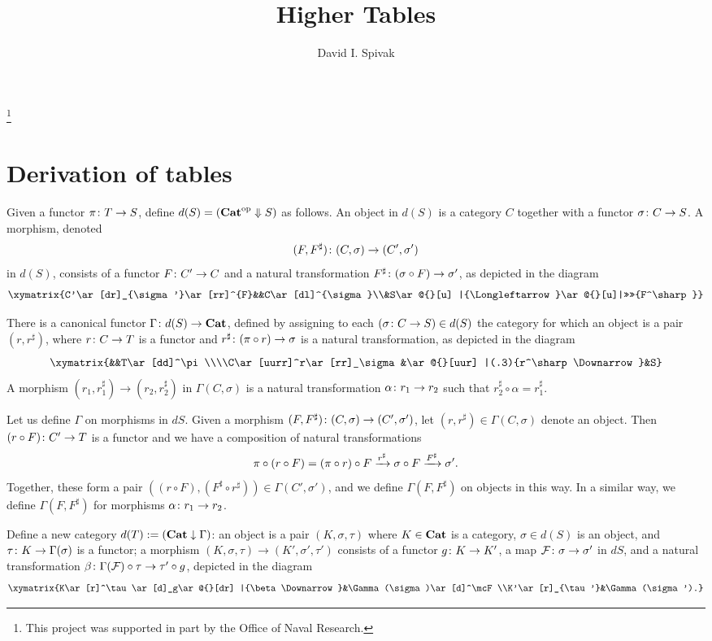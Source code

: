 \documentclass{amsart}
\makeatletter
\def\Down{\Downarrow}
\newcommand{\TriLeft}[7]{\xymatrix{#1\ar[dr]_{#2}\ar[rr]^{#3}&&#4\ar[dl]^{#5}\\&#6\ar@{}[u] |{\Longleftarrow}\ar@{}[u]|>>>>{#7}}}
\makeatother
\begin{document}
\author{David I. Spivak}

\thanks{This project was supported in part by the Office of Naval Research.}

\title{Higher Tables}

\maketitle


\section{Derivation of tables}

Given a functor $\pi\colon T\rightarrow S$, define $d(S)=(\Cat\op\Down S)$ as follows.  An object in $d(S)$ is a category $C$ together with a functor $\sigma\colon C\rightarrow S$.  A morphism, denoted $$(F,F^\sharp)\colon(C,\sigma)\rightarrow(C',\sigma')$$ in $d(S)$, consists of a functor $F\colon C'\rightarrow C$ and a natural transformation $F^\sharp\colon (\sigma\circ F)\rightarrow\sigma'$, as depicted in the diagram $$\TriLeft{C'}{\sigma'}{F}{C}{\sigma}{S}{F^\sharp}$$

There is a canonical functor $\Gamma\colon d(S)\rightarrow{\bf Cat}$, defined by assigning to each $(\sigma\colon C\rightarrow S)\in d(S)$ the category for which an object is a pair $(r,r^\sharp)$, where $r\colon C\rightarrow T$ is a functor and $r^\sharp\colon(\pi\circ r)\rightarrow\sigma$ is a natural transformation, as depicted in the diagram $$\xymatrix{&&T\ar[dd]^\pi\\\\C\ar[uurr]^r\ar[rr]_\sigma&\ar@{}[uur] |(.3){r^\sharp\Downarrow}&S}$$  A morphism $(r_1,r_1^\sharp)\to(r_2,r_2^\sharp)$ in $\Gamma(C,\sigma)$ is a natural transformation $\alpha\colon r_1\rightarrow r_2$ such that $r_2^\sharp\circ\alpha=r_1^\sharp$.

Let us define $\Gamma$ on morphisms in $dS$.  Given a morphism $(F,F^\sharp)\colon (C,\sigma)\rightarrow(C',\sigma')$, let $(r,r^\sharp)\in\Gamma(C,\sigma)$ denote an object.  Then $(r\circ F)\colon C'\rightarrow T$ is a functor and we have a composition of natural transformations $$\pi\circ(r\circ F)=(\pi\circ r)\circ F\xrightarrow{r^\sharp}\sigma\circ F\xrightarrow{F^\sharp}\sigma'.$$  Together, these form a pair $((r\circ F),(F^\sharp\circ r^\sharp))\in\Gamma(C',\sigma')$, and we define $\Gamma(F,F^\sharp)$ on objects in this way.  In a similar way, we define $\Gamma(F,F^\sharp)$ for morphisms $\alpha\colon r_1\rightarrow r_2$.

Define a new category $d(T):=({\bf Cat}\downarrow\Gamma)$: an object is a pair $(K,\sigma,\tau)$ where $K\in{\bf Cat}$ is a category, $\sigma\in d(S)$ is an object, and $\tau\colon K\rightarrow\Gamma(\sigma)$ is a functor; a morphism $(K,\sigma,\tau)\to(K',\sigma',\tau')$ consists of a functor $g\colon K\rightarrow K'$, a map $\mathcal{F}\colon\sigma\rightarrow\sigma'$ in $dS$, and a natural transformation $\beta\colon\Gamma(\mathcal{F})\circ\tau\rightarrow\tau'\circ g$, depicted in the diagram $$\xymatrix{K\ar[r]^\tau\ar[d]_g\ar@{}[dr] |{\beta\Downarrow}&\Gamma(\sigma)\ar[d]^\mcF\\K'\ar[r]_{\tau'}&\Gamma(\sigma').}$$  
\end{document}
